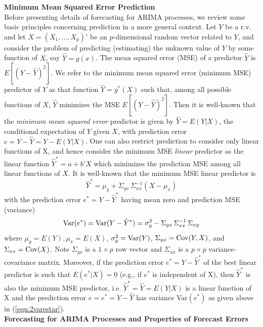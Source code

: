\noindent \textbf{Minimum Mean Squared Error Prediction} \\


Before presenting details of forecasting for ARIMA processes, we review some basic principles concerning prediction in a more general context. Let $Y$ be a r.v. and let $X = (X_1,\ldots,X_p)'$ be an $p$-dimensional random vector related to $Y$, and consider the problem of predicting (estimating) the unknown value of $Y$ by some function of $X$, say $\hat{Y} = g(x)$. The mean squared error (MSE) of a predictor $\hat{Y}$ is $E[(Y - \hat{Y})^2]$. We refer to the minimum mean squared error (minimum MSE) predictor of $Y$ as that function $\hat{Y} = g^*(X)$ such that, among all possible functions of $X$, $\hat{Y}$ minimizes the MSE $E[(Y - \hat{Y})^2]$. Then it is well-known that the \textit{minimum mean squared error} predictor is given by $\hat{Y} = E(Y|X)$, the conditional expectation of $Y$ given $X$, with prediction error $e = Y - \hat{Y} = Y - E(Y|X)$. One can also restrict prediction to consider only linear functions of X, and hence consider the minimum MSE \textit{linear} predictor as the linear function $\hat{Y}^* = a + b' X$ which minimizes the prediction MSE among all linear functions of $X$. It is well-known that the minimum MSE linear predictor is
	\begin{equation}\label{eqn:2yhatstar}
	\hat{Y}^* = \mu_y + \Sigma_{yx}\,\Sigma_{xx}^{-1}(X - \mu_x)
	\end{equation}
with the prediction error $e^* = Y - \hat{Y}^*$ having mean zero and prediction MSE (variance)
	\begin{equation}\label{eqn:2varestar}
	\Var(e^*) = \Var(Y - \hat{Y}^*) = \sigma_y^2 - \Sigma_{yx}\,\Sigma_{xx}^{-1}\,\Sigma_{xy}
	\end{equation}
where $\mu_y = E(Y), \mu_x = E(X)$, $\sigma_y^2 = \operatorname{Var}(Y)$, $\Sigma_{yx} = \operatorname{Cov}(Y,X)$, and $\Sigma_{xx} = \operatorname{Cov}(X)$. Note $\Sigma_{yx}$ is a $1 \times p$ row vector and $\Sigma_{xx}$ is a $p \times p$ variance-covariance matrix. Moreover, if the prediction error $e^* = Y - \hat{Y}^*$ of the best linear predictor is such that $E(e^*|X) = 0$ (e.g., if $e^*$ is independent of X), then $\hat{Y}^*$ is also the minimum MSE predictor, i.e. $\hat{Y}^* = \hat{Y} = E(Y|X)$ is a linear function of X and the prediction error $e = e^* = Y - \hat{Y}$ has variance Var$(e^*)$ as given above in (\ref{eqn:2varestar}). \\


\noindent\textbf{Forecasting for ARIMA Processes and Properties of Forecast Errors} \\


